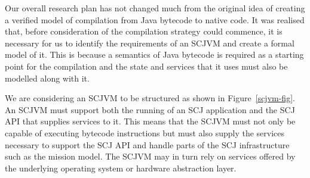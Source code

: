 \documentclass[a4paper,10pt]{report}
\begin{document}

Our overall research plan has not changed much from the original idea
of creating a verified model of compilation from Java bytecode to
native code.
It was realised that, before consideration of the compilation strategy
could commence, it is necessary for us to identify the requirements of
an SCJVM and create a formal model of it.
This is because a semantics of Java bytecode is required as a starting
point for the compilation and the state and services that it uses must
also be modelled along with it.

We are considering an SCJVM to be structured as shown in
Figure~\ref{scjvm-fig}.
An SCJVM must support both the running of an SCJ application and the
SCJ API that supplies services to it.
This means that the SCJVM must not only be capable of executing
bytecode instructions but must also supply the services necessary to
support the SCJ API and handle parts of the SCJ infrastructure such as
the mission model.
The SCJVM may in turn rely on services offered by the underlying
operating system or hardware abstraction layer.
\end{document}
